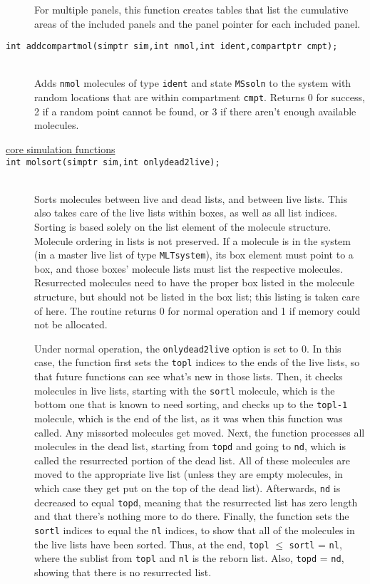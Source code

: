 \documentclass {scrbook}
\newcommand {\ttt} {\texttt}
\begin{document}
\begin{description}
For multiple panels, this function creates tables that list the cumulative areas of the included panels and the panel pointer for each included panel.

\item[\ttt{int addcompartmol(simptr sim,int nmol,int ident,compartptr cmpt);}]
\hfill \\
Adds \ttt{nmol} molecules of type \ttt{ident} and state \ttt{MSsoln} to the system with random locations that are within compartment \ttt{cmpt}. Returns 0 for success, 2 if a random point cannot be found, or 3 if there aren't enough available molecules.

\item[\underline{core simulation functions}]

\item[\ttt{int molsort(simptr sim,int onlydead2live);}]
\hfill \\
Sorts molecules between live and dead lists, and between live lists. This also takes care of the live lists within boxes, as well as all list indices. Sorting is based solely on the list element of the molecule structure. Molecule ordering in lists is not preserved. If a molecule is in the system (in a master live list of type \ttt{MLTsystem}), its box element must point to a box, and those boxes' molecule lists must list the respective molecules. Resurrected molecules need to have the proper box listed in the molecule structure, but should not be listed in the box list; this listing is taken care of here. The routine returns 0 for normal operation and 1 if memory could not be allocated.

Under normal operation, the \ttt{onlydead2live} option is set to 0. In this case, the function first sets the \ttt{topl} indices to the ends of the live lists, so that future functions can see what's new in those lists. Then, it checks molecules in live lists, starting with the \ttt{sortl} molecule, which is the bottom one that is known to need sorting, and checks up to the \ttt{topl-1} molecule, which is the end of the list, as it was when this function was called. Any missorted molecules get moved. Next, the function processes all molecules in the dead list, starting from \ttt{topd} and going to \ttt{nd}, which is called the resurrected portion of the dead list. All of these molecules are moved to the appropriate live list (unless they are empty molecules, in which case they get put on the top of the dead list). Afterwards, \ttt{nd} is decreased to equal \ttt{topd}, meaning that the resurrected list has zero length and that there's nothing more to do there. Finally, the function sets the \ttt{sortl} indices to equal the \ttt{nl} indices, to show that all of the molecules in the live lists have been sorted. Thus, at the end, \ttt{topl} $\leq$ \ttt{sortl} = \ttt{nl}, where the sublist from \ttt{topl} and \ttt{nl} is the reborn list. Also, \ttt{topd} = \ttt{nd}, showing that there is no resurrected list.


\end{description}
\end{document}
